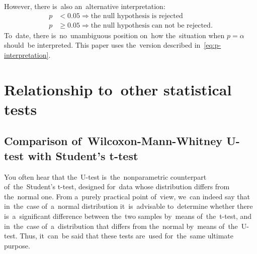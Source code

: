 \documentclass[]{scrreprt}
\begin{document}
However, there is~also an~alternative interpretation:
\begin{equation}\label{eq:p-interpretation-2}
\begin{aligned}
p &< 0.05 \Rightarrow \text{the~null hypothesis is~rejected}\\
p &\geq 0.05 \Rightarrow \text{the~null hypothesis can~not~be rejected}.
\end{aligned}
\end{equation}
To~date, there is~no~unambiguous position on~how the~situation when $p = \alpha$ should~be interpreted. This paper uses the~version described in~\ref{eq:p-interpretation}.
%
\section{Relationship to~other statistical tests}
\subsection{Comparison of~Wilcoxon-Mann-Whitney U-test with Student's t-test}
You often hear that the~U-test is~the~nonparametric counterpart of~the~Student's t-test, designed for~data whose distribution differs from the~normal one. From a~purely practical point of~view, we~can indeed say that in~the~case of~a~normal distribution it~is~advisable to~determine whether there is~a~significant difference between the~two samples by~means of~the~t-test, and in~the~case of~a~distribution that differs from the~normal by~means of~the~U-test. Thus, it~can~be said that these tests are~used for~the~same ultimate purpose.
\end{document}
